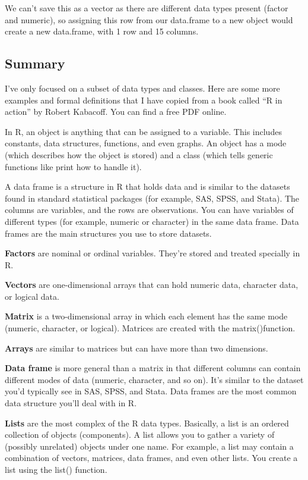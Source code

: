\documentclass[
]{book}
\begin{document}
We can't save this as a vector as there are different data types present (factor and numeric), so assigning this row from our data.frame to a new object would create a new data.frame, with 1 row and 15 columns.

\hypertarget{summary}{%
\subsection{Summary}\label{summary}}

I've only focused on a subset of data types and classes. Here are some more examples and formal definitions that I have copied from a book called ``R in action'' by Robert Kabacoff. You can find a free PDF online.

In R, an object is anything that can be assigned to a variable. This includes constants, data structures, functions, and even graphs. An object has a mode (which describes how the object is stored) and a class (which tells generic functions like print how to handle it).

A data frame is a structure in R that holds data and is similar to the datasets found in standard statistical packages (for example, SAS, SPSS, and Stata). The columns are variables, and the rows are observations. You can have variables of different types (for example, numeric or character) in the same data frame. Data frames are the main structures you use to store datasets.

\textbf{Factors} are nominal or ordinal variables. They're stored and treated specially in R.

\textbf{Vectors} are one-dimensional arrays that can hold numeric data, character data, or logical data.

\textbf{Matrix} is a two-dimensional array in which each element has the same mode
(numeric, character, or logical). Matrices are created with the matrix()function.

\textbf{Arrays} are similar to matrices but can have more than two dimensions.

\textbf{Data frame} is more general than a matrix in that different columns can contain different modes of data (numeric, character, and so on). It's similar to the dataset you'd typically see in SAS, SPSS, and Stata. Data frames are the most common data structure you'll deal with in R.

\textbf{Lists} are the most complex of the R data types. Basically, a list is an ordered collection of objects (components). A list allows you to gather a variety of (possibly unrelated) objects under one name. For example, a list may contain a combination of vectors, matrices, data frames, and even other lists. You create a list using the list() function.
\end{document}

